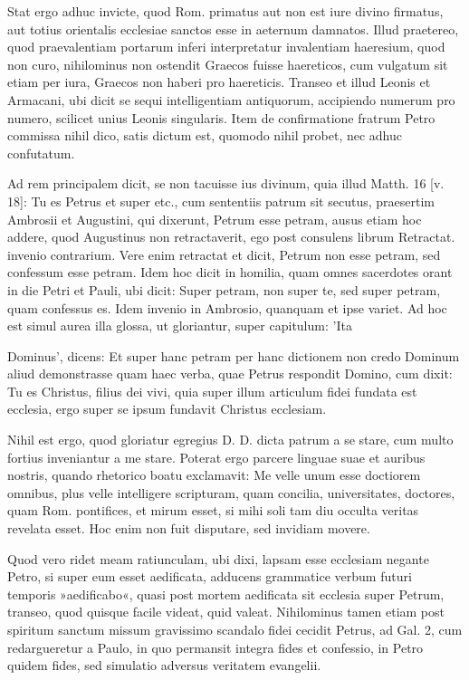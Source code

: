 Stat ergo adhuc invicte, quod Rom. primatus aut non est iure divino firmatus, aut totius orientalis ecclesiae sanctos esse in aeternum damnatos. Illud praetereo, quod praevalentiam portarum inferi interpretatur invalentiam haeresium, quod non curo, nihilominus non ostendit Graecos fuisse haereticos, cum vulgatum sit etiam per iura, Graecos non haberi pro haereticis. Transeo et illud Leonis et Armacani, ubi dicit se sequi intelligentiam antiquorum, accipiendo numerum pro numero, scilicet unius Leonis singularis. Item de confirmatione fratrum Petro commissa nihil dico, satis dictum est, quomodo nihil probet, nec adhuc confutatum.

Ad rem principalem dicit, se non tacuisse ius divinum, quia illud Matth. 16 [v. 18]: Tu es Petrus et super etc., cum sententiis patrum sit secutus, praesertim Ambrosii et Augustini, qui dixerunt, Petrum esse petram, ausus etiam hoc addere, quod Augustinus non retractaverit, ego post consulens librum Retractat. invenio contrarium. Vere enim retractat et dicit, Petrum non esse petram, sed confessum esse petram. Idem hoc dicit in homilia, quam omnes sacerdotes orant in die Petri et Pauli, ubi dicit: Super petram, non super te, sed super petram, quam confessus es. Idem invenio in Ambrosio, quanquam et ipse variet. Ad hoc est simul aurea illa glossa, ut gloriantur, super capitulum: 'Ita

Dominus', dicens: Et super hanc petram per hanc dictionem non credo Dominum aliud demonstrasse quam haec verba, quae Petrus respondit Domino, cum dixit: Tu es Christus, filius dei vivi, quia super illum articulum fidei fundata est ecclesia, ergo super se ipsum fundavit Christus ecclesiam.

Nihil est ergo, quod gloriatur egregius D. D. dicta patrum a se stare, cum multo fortius inveniantur a me stare. Poterat ergo parcere linguae suae et auribus nostris, quando rhetorico boatu exclamavit: Me velle unum esse doctiorem omnibus, plus velle intelligere scripturam, quam concilia, universitates, doctores, quam Rom. pontifices, et mirum esset, si mihi soli tam diu occulta veritas revelata esset. Hoc enim non fuit disputare, sed invidiam movere.

Quod vero ridet meam ratiunculam, ubi dixi, lapsam esse ecclesiam negante Petro, si super eum esset aedificata, adducens grammatice verbum futuri temporis »aedificabo«, quasi post mortem aedificata sit ecclesia super Petrum, transeo, quod quisque facile videat, quid valeat. Nihilominus tamen etiam post spiritum sanctum missum gravissimo scandalo fidei cecidit Petrus, ad Gal. 2, cum redargueretur a Paulo, in quo permansit integra fides et confessio, in Petro quidem fides, sed simulatio adversus veritatem evangelii.

